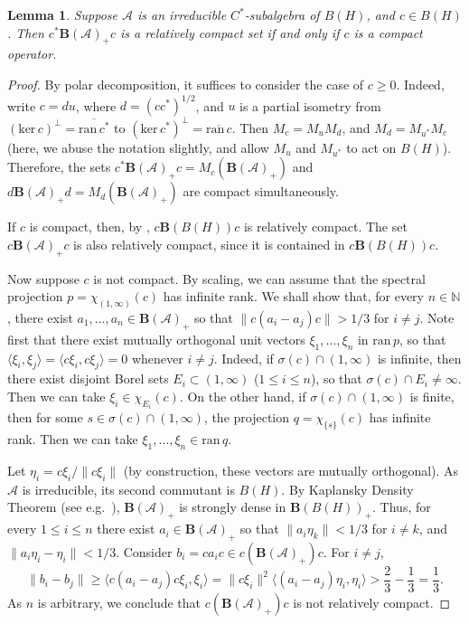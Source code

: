 \documentclass[12pt]{amsart}
\theoremstyle{plain}
\newtheorem{lemma}[theorem]{Lemma}
\theoremstyle{definition}
\renewcommand{\leq}{\leqslant}
\renewcommand{\geq}{\geqslant}\usepackage{amssymb}
\newcommand{\N}{\mathbb N}
\newcommand{\ball}{\mathbf{B}}
\newcommand{\A}{\mathcal{A}}
\def \ker{{\mathrm{ker}} \, }
\renewcommand{\span}{\mathrm{span}}
\def \ran{{\mathrm{ran}} \, }
\begin{document}
\begin{lemma}\label{lem:compact}
Suppose $\A$ is an irreducible $C^*$-subalgebra of $B(H)$, and $c \in B(H)$.
Then $c^* \ball(\A)_+ c$ is a relatively compact set if and only if
$c$ is a compact operator.
\end{lemma}

\begin{proof}
By polar decomposition, it suffices to consider the case of $c \geq 0$.
Indeed, write $c = d u$, where $d = (c c^*)^{1/2}$, and $u$ is a
partial isometry from $(\ker c)^\perp = \overline{\ran c^*}$ to
$(\ker c^*)^\perp = \overline{\ran c}$. Then $M_c = M_u M_d$,
and $M_d = M_{u^*} M_c$ (here, we abuse the notation slightly, and
allow $M_u$ and $M_{u^*}$ to act on $B(H)$). Therefore, the sets
$c^* \ball(\A)_+ c = M_c(\ball(\A)_+)$ and
$d \ball(\A)_+ d = M_d(\ball(\A)_+)$ are compact simultaneously.

If $c$ is compact, then, by \cite{Yl72PAMS}, $c \ball(B(H)) c$ is relatively
compact. The set $c \ball(\A)_+ c$ is also relatively compact, since
it is contained in $c \ball(B(H)) c$.

Now suppose $c$ is not compact. By scaling, we
can assume that the spectral projection $p = \chi_{(1,\infty)}(c)$ has
infinite rank. We shall show that, for every $n \in \N$, there exist
$a_1, \ldots, a_n \in \ball(\A)_+$ so that
$\|c(a_i - a_j)c\| > 1/3$ for $i \neq j$. Note first that there exist
mutually orthogonal unit vectors $\xi_1, \ldots, \xi_n$ in $\ran p$,
so that $\langle \xi_i, \xi_j \rangle = \langle c \xi_i, c \xi_j \rangle = 0$
whenever $i \neq j$. Indeed, if $\sigma(c) \cap (1,\infty)$ is infinite,
then there exist disjoint Borel sets $E_i \subset (1,\infty)$ ($1 \leq i \leq n$),
so that $\sigma(c) \cap E_i \neq \infty$. Then we can take $\xi_i \in \chi_{E_i}(c)$.
On the other hand, if $\sigma(c) \cap (1,\infty)$ is finite, then for some
$s \in \sigma(c) \cap (1,\infty)$, the projection $q = \chi_{\{s\}}(c)$
has infinite rank. Then we can take $\xi_1, \ldots, \xi_n \in \ran q$.

Let $\eta_i = c \xi_i/\|c \xi_i\|$ (by construction,
these vectors are mutually orthogonal).
As $\A$ is irreducible, its second commutant is $B(H)$. By
Kaplansky Density Theorem (see e.g.~\cite[Theorem I.7.3]{Da}),
$\ball(\A)_+$ is strongly dense in $\ball(B(H))_+$.
Thus, for every $1 \leq i \leq n$ there exist
$a_i \in \ball(\A)_+$ so that $\|a_i \eta_k\| < 1/3$ for $i \neq k$, and
$\|a_i \eta_i - \eta_i\| < 1/3$. Consider
$b_i = c a_i c \in c (\ball(\A)_+) c$.
For $i \neq j$,
$$
\|b_i - b_j\| \geq \langle c (a_i - a_j) c \xi_i, \xi_i \rangle =
\|c \xi_i\|^2 \langle(a_i - a_j) \eta_i, \eta_i\rangle >
\frac{2}{3} - \frac{1}{3} = \frac{1}{3} .
$$
As $n$ is arbitrary, we conclude that $c (\ball(\A)_+) c$ is not
relatively compact.
\end{proof}
\end{document}
